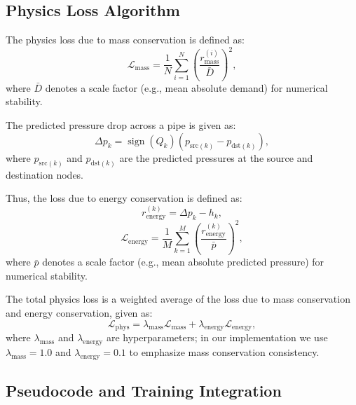 \documentclass[final,5p,times,twocolumn,authoryear]{elsarticle}
\begin{document}
\subsection{Physics Loss Algorithm}
The physics loss due to mass conservation is defined as:
\[
\mathcal{L}_{\mathrm{mass}}
=
\frac{1}{N} \sum_{i=1}^{N} \left( \frac{r^{(i)}_{\mathrm{mass}}}{\bar{D}} \right)^2,
\]
where $\bar{D}$ denotes a scale factor (e.g., mean absolute demand) for numerical stability.

The predicted pressure drop across a pipe is given as:
\[
\Delta p_k
=
\operatorname{sign}(Q_k) \left( p_{\mathrm{src}(k)} - p_{\mathrm{dst}(k)} \right),
\]
where $p_{\mathrm{src}(k)}$ and $p_{\mathrm{dst}(k)}$ are the predicted pressures at the source and destination nodes.

Thus, the loss due to energy conservation is defined as:
\[
r^{(k)}_{\mathrm{energy}}
=
\Delta p_k - h_k,
\]
\[
\mathcal{L}_{\mathrm{energy}}
=
\frac{1}{M} \sum_{k=1}^{M} \left( \frac{r^{(k)}_{\mathrm{energy}}}{\bar{p}} \right)^2,
\]
where $\bar{p}$ denotes a scale factor (e.g., mean absolute predicted pressure) for numerical stability.

The total physics loss is a weighted average of the loss due to mass conservation and energy conservation, given as:
\[
\mathcal{L}_{\mathrm{phys}}
=
\lambda_{\mathrm{mass}} \mathcal{L}_{\mathrm{mass}}
+
\lambda_{\mathrm{energy}} \mathcal{L}_{\mathrm{energy}},
\]
where $\lambda_{\mathrm{mass}}$ and $\lambda_{\mathrm{energy}}$ are hyperparameters; in our implementation we use $\lambda_{\mathrm{mass}} = 1.0$ and $\lambda_{\mathrm{energy}} = 0.1$ to emphasize mass conservation consistency.

\subsection{Pseudocode and Training Integration}
\end{document}
